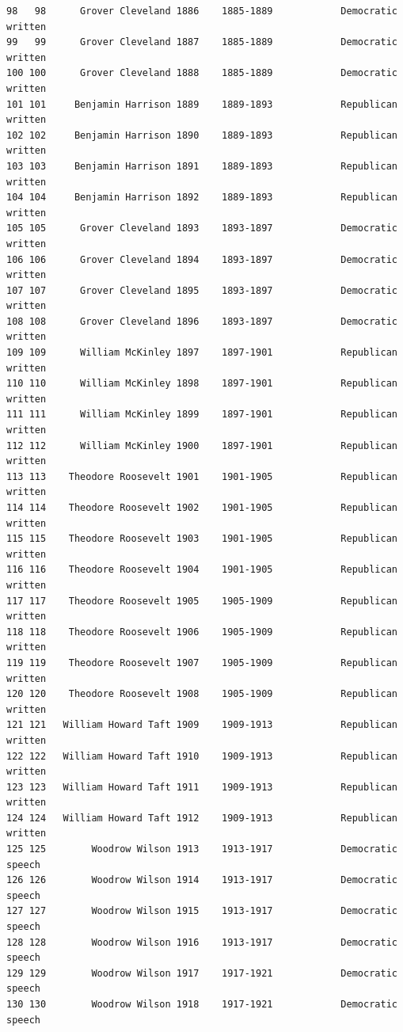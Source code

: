 \documentclass[
  letterpaper,
  DIV=11,
  numbers=noendperiod]{scrreprt}
\begin{document}
\begin{verbatim}
98   98      Grover Cleveland 1886    1885-1889            Democratic   written
99   99      Grover Cleveland 1887    1885-1889            Democratic   written
100 100      Grover Cleveland 1888    1885-1889            Democratic   written
101 101     Benjamin Harrison 1889    1889-1893            Republican   written
102 102     Benjamin Harrison 1890    1889-1893            Republican   written
103 103     Benjamin Harrison 1891    1889-1893            Republican   written
104 104     Benjamin Harrison 1892    1889-1893            Republican   written
105 105      Grover Cleveland 1893    1893-1897            Democratic   written
106 106      Grover Cleveland 1894    1893-1897            Democratic   written
107 107      Grover Cleveland 1895    1893-1897            Democratic   written
108 108      Grover Cleveland 1896    1893-1897            Democratic   written
109 109      William McKinley 1897    1897-1901            Republican   written
110 110      William McKinley 1898    1897-1901            Republican   written
111 111      William McKinley 1899    1897-1901            Republican   written
112 112      William McKinley 1900    1897-1901            Republican   written
113 113    Theodore Roosevelt 1901    1901-1905            Republican   written
114 114    Theodore Roosevelt 1902    1901-1905            Republican   written
115 115    Theodore Roosevelt 1903    1901-1905            Republican   written
116 116    Theodore Roosevelt 1904    1901-1905            Republican   written
117 117    Theodore Roosevelt 1905    1905-1909            Republican   written
118 118    Theodore Roosevelt 1906    1905-1909            Republican   written
119 119    Theodore Roosevelt 1907    1905-1909            Republican   written
120 120    Theodore Roosevelt 1908    1905-1909            Republican   written
121 121   William Howard Taft 1909    1909-1913            Republican   written
122 122   William Howard Taft 1910    1909-1913            Republican   written
123 123   William Howard Taft 1911    1909-1913            Republican   written
124 124   William Howard Taft 1912    1909-1913            Republican   written
125 125        Woodrow Wilson 1913    1913-1917            Democratic    speech
126 126        Woodrow Wilson 1914    1913-1917            Democratic    speech
127 127        Woodrow Wilson 1915    1913-1917            Democratic    speech
128 128        Woodrow Wilson 1916    1913-1917            Democratic    speech
129 129        Woodrow Wilson 1917    1917-1921            Democratic    speech
130 130        Woodrow Wilson 1918    1917-1921            Democratic    speech

\end{verbatim}
\end{document}
